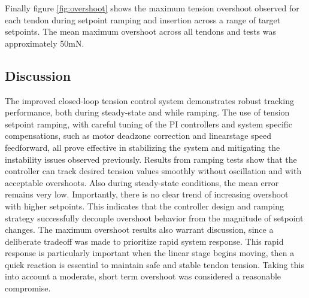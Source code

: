 Finally figure \ref{fig:overshoot} shows the maximum tension overshoot observed for each tendon during setpoint ramping and insertion across a range of target setpoints. The mean maximum overshoot across all tendons and tests was approximately 50mN. 


\subsection{Discussion}
The improved closed-loop tension control system demonstrates robust tracking performance, both during steady-state and while ramping. The use of tension setpoint ramping, with careful tuning of the PI controllers and system specific compensations, such as motor deadzone correction and linearstage speed feedforward, all prove effective in stabilizing the system and mitigating the instability issues observed previously.
\newline \newline
Results from ramping tests show that the controller can track desired tension values smoothly without oscillation and with acceptable overshoots. Also during steady-state conditions, the mean error remains very low. Importantly, there is no clear trend of increasing overshoot with higher setpoints. This indicates that the controller design and ramping strategy successfully decouple overshoot behavior from the magnitude of setpoint changes.
\newline \newline 
The maximum overshoot results also warrant discussion, since a deliberate tradeoff was made to prioritize rapid system response. This rapid response is particularly important when the linear stage begins moving, then a quick reaction is essential to maintain safe and stable tendon tension. Taking this into account a moderate, short term overshoot was considered a reasonable compromise.



